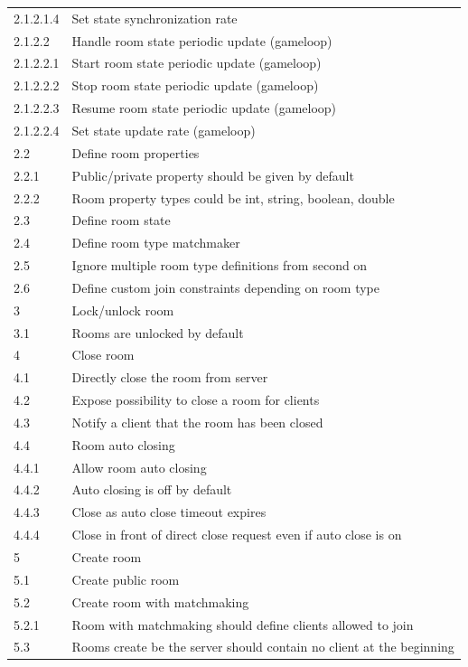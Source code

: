 \begin{center}
\begin{longtable}{|l|l|}
2.1.2.1.4 & Set state synchronization rate\\
2.1.2.2   & Handle room state periodic update (gameloop)  \\ 
2.1.2.2.1 & Start room state periodic update (gameloop) \\
2.1.2.2.2 & Stop room state periodic update (gameloop) \\
2.1.2.2.3 & Resume room state periodic update (gameloop) \\
2.1.2.2.4 & Set state update rate (gameloop) \\
2.2       & Define room properties\\
2.2.1     & Public/private property should be given by default \\
2.2.2     & Room property types could be int, string, boolean, double \\ 
2.3       & Define room state \\
2.4       & Define room type matchmaker \\
2.5       & Ignore multiple room type definitions from second on \\
2.6       & Define custom join constraints depending on room type \\
3         & Lock/unlock room \\
3.1       & Rooms are unlocked by default \\
4         & Close room \\
4.1       & Directly close the room from server \\
4.2       & Expose possibility to close a room for clients \\
4.3       & Notify a client that the room has been closed \\
4.4       & Room auto closing \\
4.4.1     & Allow room auto closing \\
4.4.2     & Auto closing is off by default \\
4.4.3     & Close as auto close timeout expires \\
4.4.4     & Close in front of direct close request even if auto close is on \\
5         & Create room \\
5.1       & Create public room \\
5.2       & Create room with matchmaking \\
5.2.1     & Room with matchmaking should define clients allowed to join \\
5.3       & Rooms create be the server should contain no client at the beginning \\

\end{longtable}
\end{center}
